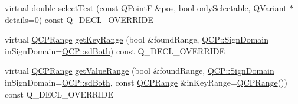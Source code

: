 \begin{DoxyCompactItemize}
\item 
virtual double \hyperlink{class_q_c_p_statistical_box_a1607fa92f829c631107c20ccb2d70a6d}{select\+Test} (const Q\+PointF \&pos, bool only\+Selectable, Q\+Variant $\ast$details=0) const Q\+\_\+\+D\+E\+C\+L\+\_\+\+O\+V\+E\+R\+R\+I\+DE
\item 
virtual \hyperlink{class_q_c_p_range}{Q\+C\+P\+Range} \hyperlink{class_q_c_p_statistical_box_a77d2d13301dfe60c13adfaa17fc1802f}{get\+Key\+Range} (bool \&found\+Range, \hyperlink{namespace_q_c_p_afd50e7cf431af385614987d8553ff8a9}{Q\+C\+P\+::\+Sign\+Domain} in\+Sign\+Domain=\hyperlink{namespace_q_c_p_afd50e7cf431af385614987d8553ff8a9aa38352ef02d51ddfa4399d9551566e24}{Q\+C\+P\+::sd\+Both}) const Q\+\_\+\+D\+E\+C\+L\+\_\+\+O\+V\+E\+R\+R\+I\+DE
\item 
virtual \hyperlink{class_q_c_p_range}{Q\+C\+P\+Range} \hyperlink{class_q_c_p_statistical_box_ab3388a21d0c2e86fbc0cba9c06ceb49b}{get\+Value\+Range} (bool \&found\+Range, \hyperlink{namespace_q_c_p_afd50e7cf431af385614987d8553ff8a9}{Q\+C\+P\+::\+Sign\+Domain} in\+Sign\+Domain=\hyperlink{namespace_q_c_p_afd50e7cf431af385614987d8553ff8a9aa38352ef02d51ddfa4399d9551566e24}{Q\+C\+P\+::sd\+Both}, const \hyperlink{class_q_c_p_range}{Q\+C\+P\+Range} \&in\+Key\+Range=\hyperlink{class_q_c_p_range}{Q\+C\+P\+Range}()) const Q\+\_\+\+D\+E\+C\+L\+\_\+\+O\+V\+E\+R\+R\+I\+DE
\end{DoxyCompactItemize}
